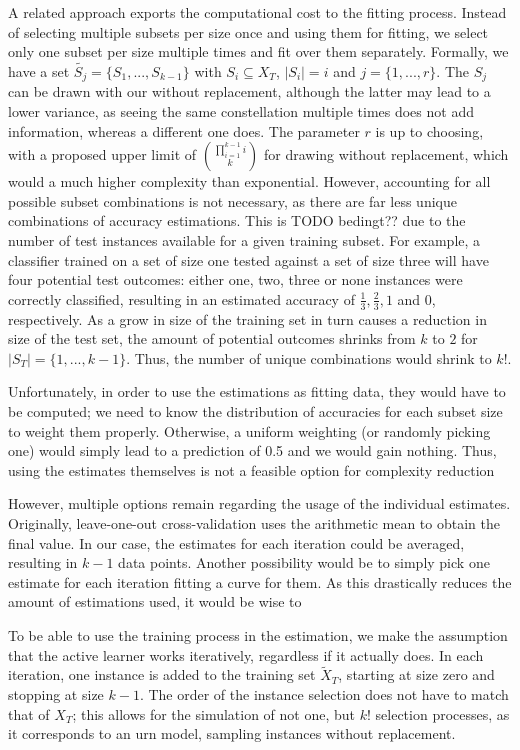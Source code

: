 A related approach exports the computational cost to the fitting process. Instead of selecting multiple subsets per size once and using them for fitting, we select only one subset per size multiple times and fit over them separately. Formally, we have a set $\tilde{S_j} = \{S_1,...,S_{k-1}\}$ with $S_i \subseteq X_T$, $|S_i| = i$ and $j = \{1,...,r\}$. The $S_j$ can be drawn with our without replacement, although the latter may lead to a lower variance, as seeing the same constellation multiple times does not add information, whereas a different one does. The parameter $r$ is up to choosing, with a proposed upper limit of $\prod_{i=1}^{k-1} i \choose k$ for drawing without replacement, which would a much higher complexity than exponential. However, accounting for all possible subset combinations is not necessary, as there are far less unique combinations of accuracy estimations. This is TODO bedingt?? due to the number of test instances available for a given training subset. For example, a classifier trained on a set of size one tested against a set of size three will have four potential test outcomes: either one, two, three or none instances were correctly classified, resulting in an estimated accuracy of $\frac{1}{3}, \frac{2}{3}, 1$ and $0$, respectively. As a grow in size of the training set in turn causes a reduction in size of the test set, the amount of potential outcomes shrinks from $k$ to $2$ for $|S_T| = \{1, ..., k-1\}$. Thus, the number of unique combinations would shrink to $k!$.

Unfortunately, in order to use the estimations as fitting data, they would have to be computed; we need to know the distribution of accuracies for each subset size to weight them properly. Otherwise, a uniform weighting (or randomly picking one) would simply lead to a prediction of 0.5 and we would gain nothing. Thus, using the estimates themselves is not a feasible option for complexity reduction

However, multiple options remain regarding the usage of the individual estimates. Originally, leave-one-out cross-validation uses the arithmetic mean to obtain the final value. In our case, the estimates for each iteration could be averaged, resulting in $k-1$ data points. Another possibility would be to simply pick one estimate for each iteration fitting a curve for them. As this drastically reduces the amount of estimations used, it would be wise to 

To be able to use the training process in the estimation, we make the assumption that the active learner works iteratively, regardless if it actually does. In each iteration, one instance is added to the training set $\tilde{X}_T$, starting at size zero and stopping at size $k-1$. The order of the instance selection does not have to match that of $X_T$; this allows for the simulation of not one, but $k!$ selection processes, as it corresponds to an urn model, sampling instances without replacement.

